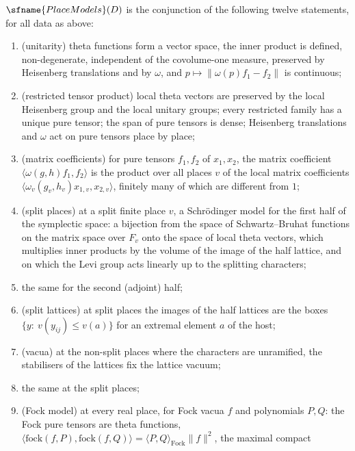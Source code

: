 \begin{definition}\label{pf:sh-theta:pm}
$\sfname{PlaceModels}(D)$ is the conjunction of the following twelve statements, for all data as above:
\begin{enumerate}[label=(P\arabic*),leftmargin=*]
\item\label{pf:sh-theta:P1} (unitarity) theta functions form a vector space, the inner product is defined, non-degenerate,
independent of the covolume-one measure, preserved by Heisenberg translations and by $\omega$, and $p\mapsto\|\omega(p)f_1-f_2\|$
is continuous;
\item\label{pf:sh-theta:P2} (restricted tensor product) local theta vectors are preserved by the local Heisenberg group and the
local unitary groups; every restricted family has a unique pure tensor; the span of pure tensors is dense; Heisenberg
translations and $\omega$ act on pure tensors place by place;
\item\label{pf:sh-theta:P3} (matrix coefficients) for pure tensors $f_1,f_2$ of $x_1,x_2$, the matrix coefficient
$\langle\omega(g,h)f_1,f_2\rangle$ is the product over all places $v$ of the local matrix coefficients
$\langle\omega_v(g_v,h_v)x_{1,v},x_{2,v}\rangle$, finitely many of which are different from $1$;
\item\label{pf:sh-theta:P4} (split places) at a split finite place $v$, a Schr\"odinger model for the first half of the
symplectic space: a bijection from the space of Schwartz--Bruhat functions on the matrix space over $F_v$ onto the space of
local theta vectors, which multiplies inner products by the volume of the image of the half lattice, and on which the Levi
group acts linearly up to the splitting characters;
\item\label{pf:sh-theta:P5} the same for the second (adjoint) half;
\item\label{pf:sh-theta:P6} (split lattices) at split places the images of the half lattices are the boxes
$\{y:\ v(y_{ij})\le v(a)\}$ for an extremal element $a$ of the host;
\item\label{pf:sh-theta:P7} (vacua) at the non-split places where the characters are unramified, the stabilisers of the lattices
fix the lattice vacuum;
\item\label{pf:sh-theta:P8} the same at the split places;
\item\label{pf:sh-theta:P9} (Fock model) at every real place, for Fock vacua $f$ and polynomials $P,Q$: the Fock pure tensors are
theta functions, $\langle\mathrm{fock}(f,P),\mathrm{fock}(f,Q)\rangle=\langle P,Q\rangle_{\mathrm{Fock}}\|f\|^2$, the maximal compact

\end{enumerate}
\end{definition}
